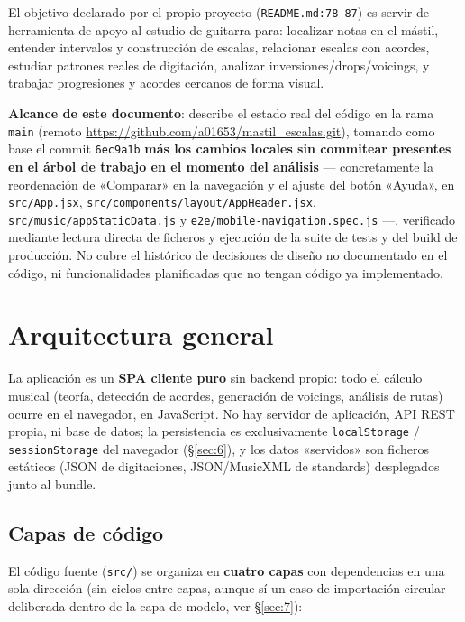 \documentclass[a4paper,11pt,oneside]{report}
\newcommand{\Sref}[1]{\S\ref{#1}}
\begin{document}
El objetivo declarado por el propio proyecto (\lstinline!README.md:78-87!) es servir de herramienta de apoyo al estudio de guitarra para: localizar notas en el mástil, entender intervalos y construcción de escalas, relacionar escalas con acordes, estudiar patrones reales de digitación, analizar inversiones/drops/voicings, y trabajar progresiones y acordes cercanos de forma visual.

\textbf{Alcance de este documento}: describe el estado real del código en la rama \lstinline!main! (remoto \url{https://github.com/a01653/mastil_escalas.git}), tomando como base el commit \lstinline!6ec9a1b! \textbf{más los cambios locales sin commitear presentes en el árbol de trabajo en el momento del análisis} --- concretamente la reordenación de «Comparar» en la navegación y el ajuste del botón «Ayuda», en \lstinline!src/App.jsx!, \lstinline!src/components/layout/AppHeader.jsx!, \lstinline!src/music/appStaticData.js! y \lstinline!e2e/mobile-navigation.spec.js! ---, verificado mediante lectura directa de ficheros y ejecución de la suite de tests y del build de producción. No cubre el histórico de decisiones de diseño no documentado en el código, ni funcionalidades planificadas que no tengan código ya implementado.

\chapter{Arquitectura general}
\label{sec:2}

La aplicación es un \textbf{SPA cliente puro} sin backend propio: todo el cálculo musical (teoría, detección de acordes, generación de voicings, análisis de rutas) ocurre en el navegador, en JavaScript. No hay servidor de aplicación, API REST propia, ni base de datos; la persistencia es exclusivamente \lstinline!localStorage! / \lstinline!sessionStorage! del navegador (\Sref{sec:6}), y los datos «servidos» son ficheros estáticos (JSON de digitaciones, JSON/MusicXML de standards) desplegados junto al bundle.

\section{Capas de código}
\label{sec:2.1}

El código fuente (\lstinline!src/!) se organiza en \textbf{cuatro capas} con dependencias en una sola dirección (sin ciclos entre capas, aunque sí un caso de importación circular deliberada dentro de la capa de modelo, ver \Sref{sec:7}):
\end{document}
